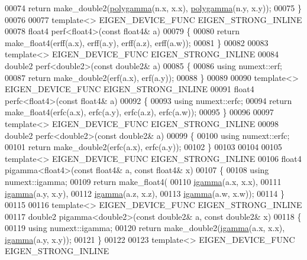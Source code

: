 \begin{DoxyCode}
00074     \textcolor{keywordflow}{return} make\_double2(\hyperlink{namespace_eigen_ae3b47a13a0699f5dbaa0623c11333dca}{polygamma}(n.x, x.x), \hyperlink{namespace_eigen_ae3b47a13a0699f5dbaa0623c11333dca}{polygamma}(n.y, x.y));
00075 \}
00076 
00077 \textcolor{keyword}{template}<> EIGEN\_DEVICE\_FUNC EIGEN\_STRONG\_INLINE
00078 float4 perf<float4>(\textcolor{keyword}{const} float4& a)
00079 \{
00080   \textcolor{keywordflow}{return} make\_float4(erff(a.x), erff(a.y), erff(a.z), erff(a.w));
00081 \}
00082 
00083 \textcolor{keyword}{template}<> EIGEN\_DEVICE\_FUNC EIGEN\_STRONG\_INLINE
00084 double2 perf<double2>(\textcolor{keyword}{const} double2& a)
00085 \{
00086   \textcolor{keyword}{using} numext::erf;
00087   \textcolor{keywordflow}{return} make\_double2(erf(a.x), erf(a.y));
00088 \}
00089 
00090 \textcolor{keyword}{template}<> EIGEN\_DEVICE\_FUNC EIGEN\_STRONG\_INLINE
00091 float4 perfc<float4>(\textcolor{keyword}{const} float4& a)
00092 \{
00093   \textcolor{keyword}{using} numext::erfc;
00094   \textcolor{keywordflow}{return} make\_float4(erfc(a.x), erfc(a.y), erfc(a.z), erfc(a.w));
00095 \}
00096 
00097 \textcolor{keyword}{template}<> EIGEN\_DEVICE\_FUNC EIGEN\_STRONG\_INLINE
00098 double2 perfc<double2>(\textcolor{keyword}{const} double2& a)
00099 \{
00100   \textcolor{keyword}{using} numext::erfc;
00101   \textcolor{keywordflow}{return} make\_double2(erfc(a.x), erfc(a.y));
00102 \}
00103 
00104 
00105 \textcolor{keyword}{template}<> EIGEN\_DEVICE\_FUNC EIGEN\_STRONG\_INLINE
00106 float4 pigamma<float4>(\textcolor{keyword}{const} float4& a, \textcolor{keyword}{const} float4& x)
00107 \{
00108   \textcolor{keyword}{using} numext::igamma;
00109   \textcolor{keywordflow}{return} make\_float4(
00110       \hyperlink{namespace_eigen_af5aa651137636b1cdbd27de1cfe91148}{igamma}(a.x, x.x),
00111       \hyperlink{namespace_eigen_af5aa651137636b1cdbd27de1cfe91148}{igamma}(a.y, x.y),
00112       \hyperlink{namespace_eigen_af5aa651137636b1cdbd27de1cfe91148}{igamma}(a.z, x.z),
00113       \hyperlink{namespace_eigen_af5aa651137636b1cdbd27de1cfe91148}{igamma}(a.w, x.w));
00114 \}
00115 
00116 \textcolor{keyword}{template}<> EIGEN\_DEVICE\_FUNC EIGEN\_STRONG\_INLINE
00117 double2 pigamma<double2>(\textcolor{keyword}{const} double2& a, \textcolor{keyword}{const} double2& x)
00118 \{
00119   \textcolor{keyword}{using} numext::igamma;
00120   \textcolor{keywordflow}{return} make\_double2(\hyperlink{namespace_eigen_af5aa651137636b1cdbd27de1cfe91148}{igamma}(a.x, x.x), \hyperlink{namespace_eigen_af5aa651137636b1cdbd27de1cfe91148}{igamma}(a.y, x.y));
00121 \}
00122 
00123 \textcolor{keyword}{template}<> EIGEN\_DEVICE\_FUNC EIGEN\_STRONG\_INLINE

\end{DoxyCode}
